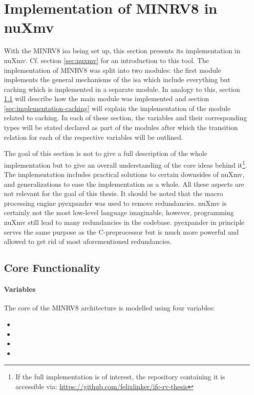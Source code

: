 \section{Implementation of MINRV8 in nuXmv}
\label{sec:model-implementation}

With the MINRV8 \gls{isa} being set up, this section presents its implementation in nuXmv.
Cf. section \ref{sec:nuxmv} for an introduction to this tool.
The implementation of MINRV8 was split into two modules:
the first module implements the general mechanisms of the \gls{isa} which include everything but caching which is implemented in a separate module.
In analogy to this, section \ref{sec:implementation-core} will describe how the main module was implemented and section \ref{sec:implementation-caching} will explain the implementation of the module related to caching.
In each of these section, the variables and their corresponding types will be stated declared as part of the modules after which the transition relation for each of the respective variables will be outlined.

The goal of this section is not to give a full description of the whole implementation but to give an overall understanding of the core ideas behind it\footnote{%
    If the full implementation is of interest, the repository containing it is accessible via: \url{https://github.com/felixlinker/ifc-rv-thesis}
}.
The implementation includes practical solutions to certain downsides of nuXmv, and generalizations to ease the implementation as a whole.
All these aspects are not relevant for the goal of this thesis.
It should be noted that the macro processing engine pyexpander \cite{pyexpander} was used to remove redundancies.
nuXmv is certainly not the most low-level language imaginable, however, programming nuXmv still lead to many redundancies in the codebase.
pyexpander in principle serves the same purpose as the C-preprocessor but is much more powerful and allowed to get rid of most aforementioned redundancies.

\subsection{Core Functionality}
\label{sec:implementation-core}

\paragraph{Variables}
The core of the MINRV8 architecture is modelled using four variables:
\begin{itemize}
    \item {}
    \item {}
    \item {}
    \item {}
\end{itemize}

